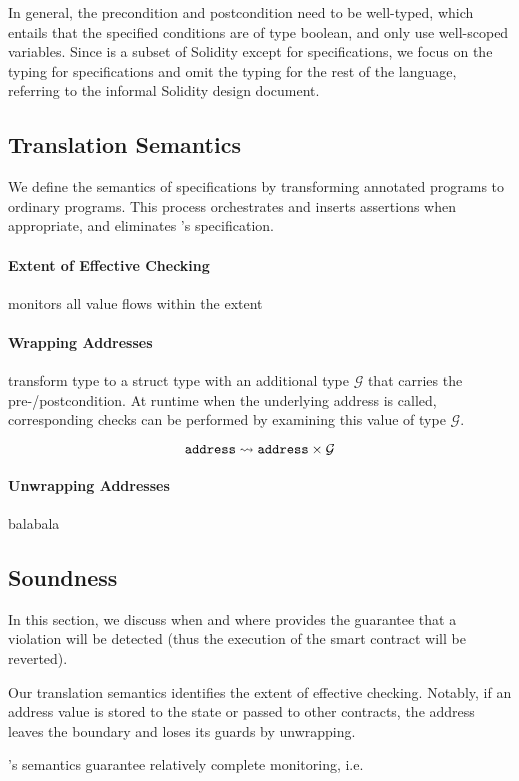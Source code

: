 In general, the precondition and postcondition need to be well-typed, which
entails that the specified conditions are of type boolean, and only
use well-scoped variables.
Since \corelang is a subset of Solidity except for specifications, we focus on
the typing for specifications and omit the typing for the rest of the language,
referring to the informal Solidity design document.


\subsection{Translation Semantics}

We define the semantics of specifications by transforming annotated programs
to ordinary programs. This process orchestrates and inserts assertions when appropriate,
and eliminates \lang's specification.


\paragraph{Extent of Effective Checking}
monitors all value flows within the extent

\paragraph{Wrapping Addresses} \lang transform  type to a struct
type with an additional type $\mathcal{G}$ that carries the pre-/postcondition.
At runtime when the underlying address is called,
corresponding checks can be performed by examining this value of type $\mathcal{G}$.

$$
\texttt{address} \leadsto \texttt{address} \times \mathcal{G}
$$

\paragraph{Unwrapping Addresses} balabala

\subsection{Soundness}

In this section, we discuss when and where \corelang provides the guarantee
that a violation will be detected (thus the execution of the smart contract
will be reverted).

Our translation semantics identifies the extent of effective checking.
Notably, if an address value is stored to the state or passed to other
contracts, the address leaves the boundary and loses its guards by unwrapping.


\corelang's semantics guarantee relatively complete monitoring, i.e.



